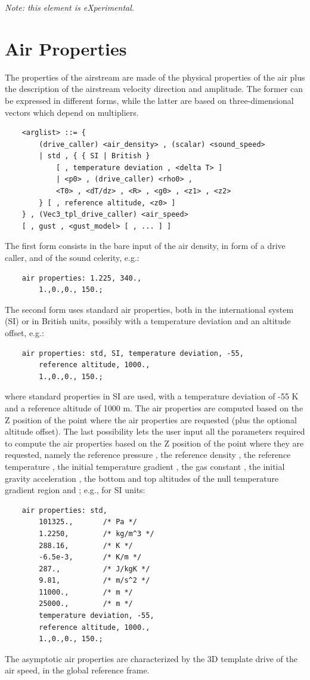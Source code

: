 \noindent
\emph{Note: this element is eXperimental.}




\section{Air Properties}\label{sec:EL:AERO:AIRPROPERTIES}
The properties of the airstream are made of the physical properties
of the air plus the description of the airstream velocity direction
and amplitude.
The former can be expressed in different forms, while the latter
are based on three-dimensional vectors which depend on multipliers.
\begin{verbatim}
    <arglist> ::= {
        (drive_caller) <air_density> , (scalar) <sound_speed> 
        | std , { { SI | British }
            [ , temperature deviation , <delta T> ]
            | <p0> , (drive_caller) <rho0> ,
            <T0> , <dT/dz> , <R> , <g0> , <z1> , <z2>
        } [ , reference altitude, <z0> ]
    } , (Vec3_tpl_drive_caller) <air_speed>
    [ , gust , <gust_model> [ , ... ] ]
\end{verbatim}
The first form consists in the bare input of the air density,
in form of a drive caller, and of the sound celerity, e.g.:
\begin{verbatim}
    air properties: 1.225, 340.,
        1.,0.,0., 150.;
\end{verbatim}
The second form uses standard air properties, both in the
international system (SI) or in British units, possibly
with a temperature deviation and an altitude offset, e.g.:
\begin{verbatim}
    air properties: std, SI, temperature deviation, -55,
        reference altitude, 1000.,
        1.,0.,0., 150.;
\end{verbatim}
where standard properties in SI are used, with a temperature
deviation of -55 K and a reference altitude of 1000 m.
The air properties are computed based on the Z position of the
point where the air properties are requested (plus the optional
altitude offset).
The last possibility lets the user input all the parameters
required to compute the air properties based on the Z position
of the point where they are requested, namely the reference
pressure , the reference density ,
the reference temperature , the initial temperature
gradient , the gas constant , the
initial gravity acceleration , the bottom and top
altitudes of the null temperature gradient region  and
; e.g., for SI units:
\begin{verbatim}
    air properties: std,
        101325.,       /* Pa */
        1.2250,        /* kg/m^3 */
        288.16,        /* K */
        -6.5e-3,       /* K/m */
        287.,          /* J/kgK */
        9.81,          /* m/s^2 */
        11000.,        /* m */
        25000.,        /* m */
        temperature deviation, -55,
        reference altitude, 1000.,
        1.,0.,0., 150.;
\end{verbatim}
The asymptotic air properties are characterized by the 3D template drive 
of the air speed, in the global reference frame.

